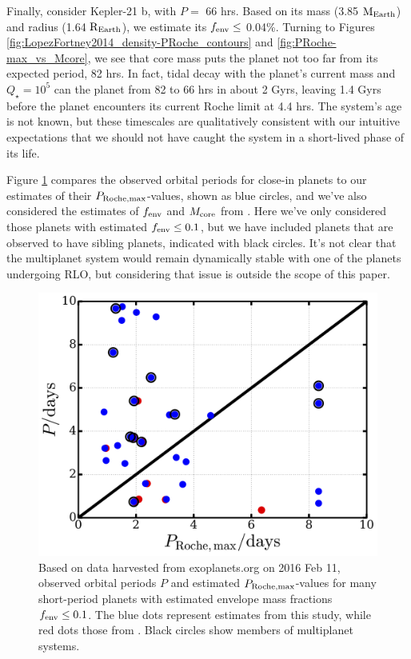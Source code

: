\documentclass{svjour3}                     %
\providecommand{\DIFadd}[1]{{\protect\color{blue}\uwave{#1}}} %
\providecommand{\DIFaddbegin}{} %
\providecommand{\DIFaddend}{} %
\begin{document}
Finally, consider Kepler-21 b, with $P =$ 66 hrs. Based on its mass (3.85 ${\rm M_{Earth}}$) and radius (1.64 ${\rm R_{Earth}}$), we estimate its $f_{\rm env} \le$ 0.04\%. Turning to Figures \ref{fig:LopezFortney2014_density-PRoche_contours} and \ref{fig:PRoche-max_vs_Mcore}, we see that core mass puts the planet not too far from its expected period, 82 hrs. In fact, tidal decay with the planet's current mass and $Q_\star = 10^5$ can \DIFaddbegin \DIFadd{move }\DIFaddend the planet from 82 to 66 hrs in about 2 Gyrs, leaving 1.4 Gyrs before the planet encounters its current Roche limit at 4.4 hrs. The system's age is not known, but these timescales are qualitatively consistent with our intuitive expectations that we should not have caught the system in a short-lived phase of its life.

Figure \ref{fig:P_vs_PRoche-max} compares the observed orbital periods for close-in planets to our estimates of their $P_{\rm Roche, max}$-values, shown as blue circles, and we've also considered the estimates of $f_{\rm env}$ and $M_{\rm core}$ from \cite{Lopez2014Understanding}. Here we've only considered those planets with estimated $f_{\rm env} \le 0.1$, but we have included planets that are observed to have sibling planets, indicated with black circles. It's not clear that the multiplanet system would remain dynamically stable with one of the planets undergoing RLO, but considering that issue is outside the scope of this paper.

\begin{figure}
\includegraphics[width=\textwidth]{P_vs_PRoche-max}
\caption{Based on data harvested from exoplanets.org on 2016 Feb 11, observed orbital periods $P$ and estimated $P_{\rm Roche, max}$-values for many short-period planets with estimated envelope mass fractions $f_{\rm env} \le 0.1$. The blue dots represent estimates from this study, while red dots those from \cite{Lopez2014Understanding}. Black circles show members of multiplanet systems.}
\label{fig:P_vs_PRoche-max}
\end{figure}
\end{document}
